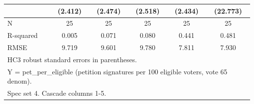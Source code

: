 \begin{table}[htbp]
\begin{tabular}{l*{5}{c}}
            &     (2.412)   &     (2.474)   &     (2.518)   &     (2.434)   &    (22.773)   \\
\midrule
N           &          25   &          25   &          25   &          25   &          25   \\
R-squared   &       0.005   &       0.071   &       0.080   &       0.441   &       0.481   \\
RMSE        &       9.719   &       9.601   &       9.780   &       7.811   &       7.930   \\
\bottomrule
\multicolumn{6}{l}{\footnotesize HC3 robust standard errors in parentheses.}\\
\multicolumn{6}{l}{\footnotesize Y = pet\_per\_eligible (petition signatures per 100 eligible voters, vote 65 denom).}\\
\multicolumn{6}{l}{\footnotesize Spec set 4. Cascade columns 1-5.}\\
\end{tabular}
\end{table}
